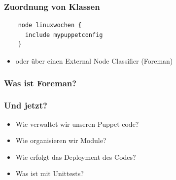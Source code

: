 \documentclass{beamer}
\begin{document}
\begin{frame}[fragile]
  \frametitle{Zuordnung von Klassen}

  \begin{lstlisting}
    node linuxwochen {
      include mypuppetconfig
    }
  \end{lstlisting}

  \begin{itemize}
  \item oder über einen External Node Classifier (Foreman)
  \end{itemize}
\end{frame}

\begin{frame}
  \frametitle{Was ist Foreman?}
  \begin{figure}[ht]
    \centering
    \label{fig:stack}
  \end{figure}
\end{frame}

\begin{frame}
  \frametitle{Und jetzt?}

  \begin{itemize}
  \item Wie verwaltet wir unseren Puppet code?
  \item Wie organisieren wir Module?
  \item Wie erfolgt das Deployment des Codes?
  \item Was ist mit Unittests?
  \end{itemize}
\end{frame}
\end{document}
